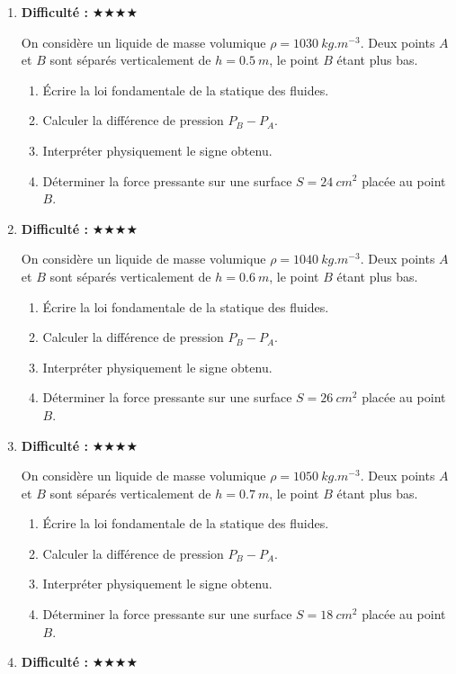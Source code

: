 \documentclass[11pt,a4paper]{article}
\newcommand{\etoiles}[1]{\textbf{Difficulté : }#1}
\begin{document}
\begin{enumerate}[label=\textbf{Exercice \arabic*.},leftmargin=*]
On considère un liquide de masse volumique $\rho=1020\ \si{kg.m^{-3}}$.
Deux points $A$ et $B$ sont séparés verticalement de $h=0.4\ \si{m}$, le point $B$ étant plus bas.
\begin{enumerate}[label=\alph*)]
\item Écrire la loi fondamentale de la statique des fluides.
\item Calculer la différence de pression $P_B-P_A$.
\item Interpréter physiquement le signe obtenu.
\item Déterminer la force pressante sur une surface $S=22\ \si{cm^2}$ placée au point $B$.
\end{enumerate}
\item \etoiles{★★★★}

On considère un liquide de masse volumique $\rho=1030\ \si{kg.m^{-3}}$.
Deux points $A$ et $B$ sont séparés verticalement de $h=0.5\ \si{m}$, le point $B$ étant plus bas.
\begin{enumerate}[label=\alph*)]
\item Écrire la loi fondamentale de la statique des fluides.
\item Calculer la différence de pression $P_B-P_A$.
\item Interpréter physiquement le signe obtenu.
\item Déterminer la force pressante sur une surface $S=24\ \si{cm^2}$ placée au point $B$.
\end{enumerate}
\item \etoiles{★★★★}

On considère un liquide de masse volumique $\rho=1040\ \si{kg.m^{-3}}$.
Deux points $A$ et $B$ sont séparés verticalement de $h=0.6\ \si{m}$, le point $B$ étant plus bas.
\begin{enumerate}[label=\alph*)]
\item Écrire la loi fondamentale de la statique des fluides.
\item Calculer la différence de pression $P_B-P_A$.
\item Interpréter physiquement le signe obtenu.
\item Déterminer la force pressante sur une surface $S=26\ \si{cm^2}$ placée au point $B$.
\end{enumerate}
\item \etoiles{★★★★}

On considère un liquide de masse volumique $\rho=1050\ \si{kg.m^{-3}}$.
Deux points $A$ et $B$ sont séparés verticalement de $h=0.7\ \si{m}$, le point $B$ étant plus bas.
\begin{enumerate}[label=\alph*)]
\item Écrire la loi fondamentale de la statique des fluides.
\item Calculer la différence de pression $P_B-P_A$.
\item Interpréter physiquement le signe obtenu.
\item Déterminer la force pressante sur une surface $S=18\ \si{cm^2}$ placée au point $B$.
\end{enumerate}
\item \etoiles{★★★★}


\end{enumerate}
\end{document}
